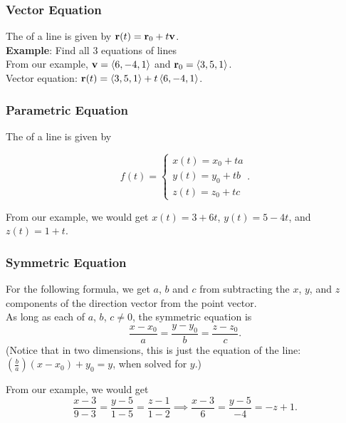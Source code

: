 \subsubsection{Vector Equation}

The  of a line is given by \(\mathbf{r}(t) = \mathbf{r}_{0} + t \mathbf{v}\). \\

\textbf{Example}: Find all 3 equations of lines  \\

From our example, \(\mathbf{v} = \left\langle 6,-4,1 \right\rangle\) and \(\mathbf{r}_{0} = \left\langle 3,5,1 \right\rangle\). \\

Vector equation: \(\mathbf{r}(t) = \left\langle 3,5,1 \right\rangle + t\left\langle 6,-4,1 \right\rangle\).

\subsubsection{Parametric Equation}

The  of a line is given by

\[
    f(t) = \begin{cases}
        x(t) = x_{0} + ta \\
        y(t) = y_{0} + tb \\
        z(t) = z_{0} + tc
    \end{cases}.
\]

From our example, we would get \(x(t) = 3 + 6t\), \(y(t) = 5 - 4t\), and \(z(t) = 1 + t\).

\subsubsection{Symmetric Equation}

For the following formula, we get \(a\), \(b\) and \(c\) from subtracting the \(x\), \(y\), and \(z\) components of the direction vector from the point vector. \\

As long as each of \(a\), \(b\), \(c \neq 0\), the symmetric equation is
\[
    \frac{x - x_{0}}{a} = \frac{y - y_{0}}{b} = \frac{z - z_{0}}{c}.
\]
(Notice that in two dimensions, this is just the equation of the line: \((\frac{b}{a})(x - x_{0}) + y_{0} = y\), when solved for \(y\).)

From our example, we would get
\[
\frac{x - 3}{9 - 3} = \frac{y - 5}{1 - 5} = \frac{z - 1}{1 - 2} \implies \frac{x - 3}{6} = \frac{y - 5}{-4} = -z + 1.
\]


